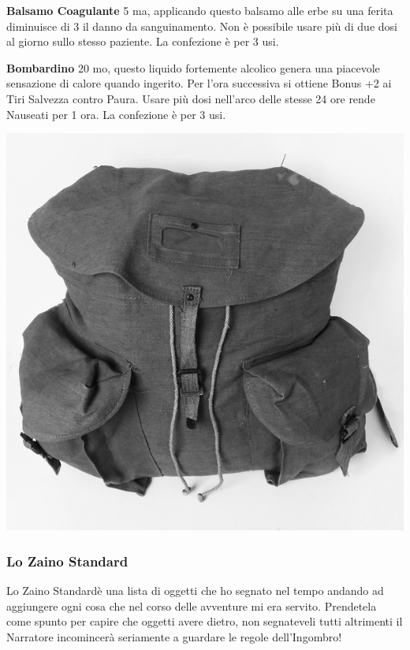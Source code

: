\begin{multicols}{2}

\textbf{Balsamo Coagulante} 5 ma, applicando questo balsamo alle erbe su una ferita diminuisce di 3 il danno da sanguinamento. Non è possibile usare più di due dosi al giorno sullo stesso paziente. La confezione è per 3 usi.

\textbf{Bombardino} 20 mo, questo liquido fortemente alcolico genera una piacevole sensazione di calore quando ingerito. Per l'ora successiva si ottiene Bonus +2 ai Tiri Salvezza contro Paura. Usare più dosi nell'arco delle stesse 24 ore rende Nauseati per 1 ora. La confezione è per 3 usi.

\begin{center}
\includegraphics[width=0.7\linewidth]{immagini/zaino.png}
\end{center}

\subsubsection{Lo Zaino Standard}

Lo Zaino Standard\textregistered \space è una lista di oggetti che ho segnato nel tempo andando ad aggiungere ogni cosa che nel corso delle avventure mi era servito.
Prendetela come spunto per capire che oggetti avere dietro, non segnateveli tutti altrimenti il Narratore incomincerà seriamente a guardare le regole dell'Ingombro!


\end{multicols}
